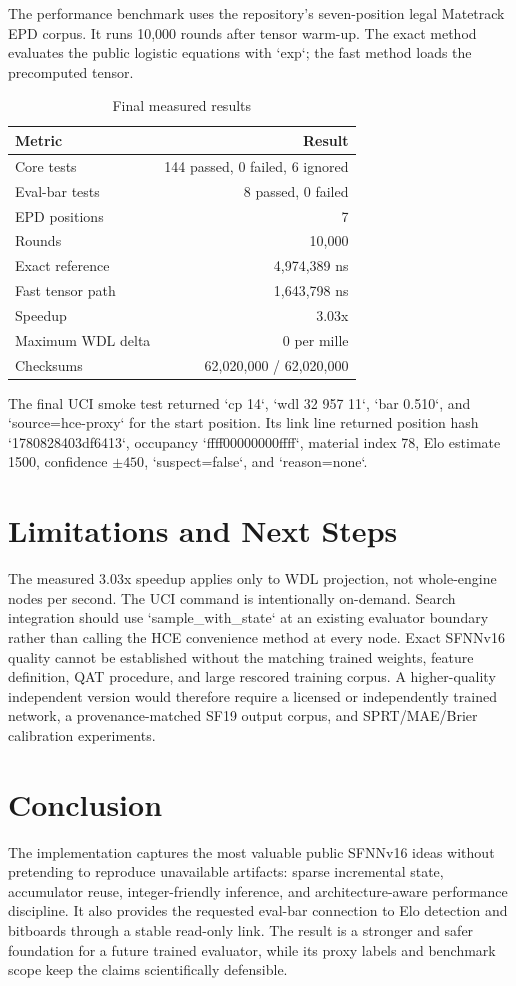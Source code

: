 \documentclass[10pt,conference]{IEEEtran}
\begin{document}
The performance benchmark uses the repository's seven-position legal Matetrack EPD corpus. It runs 10,000 rounds after tensor warm-up. The exact method evaluates the public logistic equations with `exp`; the fast method loads the precomputed tensor.

\begin{table}[t]
\centering
\caption{Final measured results}
\label{tab:results}
\begin{tabular}{lr}
\toprule
Metric & Result\\
\midrule
Core tests & 144 passed, 0 failed, 6 ignored\\
Eval-bar tests & 8 passed, 0 failed\\
EPD positions & 7\\
Rounds & 10,000\\
Exact reference & 4,974,389 ns\\
Fast tensor path & 1,643,798 ns\\
Speedup & 3.03x\\
Maximum WDL delta & 0 per mille\\
Checksums & 62,020,000 / 62,020,000\\
\bottomrule
\end{tabular}
\end{table}

The final UCI smoke test returned `cp 14`, `wdl 32 957 11`, `bar 0.510`, and `source=hce-proxy` for the start position. Its link line returned position hash `1780828403df6413`, occupancy `ffff00000000ffff`, material index 78, Elo estimate 1500, confidence $\pm450$, `suspect=false`, and `reason=none`.

\section{Limitations and Next Steps}
The measured 3.03x speedup applies only to WDL projection, not whole-engine nodes per second. The UCI command is intentionally on-demand. Search integration should use `sample\_with\_state` at an existing evaluator boundary rather than calling the HCE convenience method at every node. Exact SFNNv16 quality cannot be established without the matching trained weights, feature definition, QAT procedure, and large rescored training corpus. A higher-quality independent version would therefore require a licensed or independently trained network, a provenance-matched SF19 output corpus, and SPRT/MAE/Brier calibration experiments.

\section{Conclusion}
The implementation captures the most valuable public SFNNv16 ideas without pretending to reproduce unavailable artifacts: sparse incremental state, accumulator reuse, integer-friendly inference, and architecture-aware performance discipline. It also provides the requested eval-bar connection to Elo detection and bitboards through a stable read-only link. The result is a stronger and safer foundation for a future trained evaluator, while its proxy labels and benchmark scope keep the claims scientifically defensible.
\end{document}
